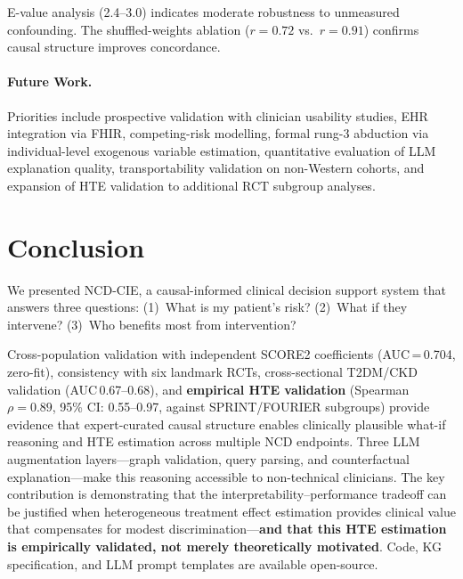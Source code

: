 \documentclass[runningheads]{llncs}
\begin{document}
E-value analysis (2.4--3.0) indicates moderate robustness to
unmeasured confounding.
The shuffled-weights ablation ($r = 0.72$ vs.\ $r = 0.91$)
confirms causal structure improves concordance.

\paragraph{Future Work.}
Priorities include prospective validation with clinician usability
studies, EHR integration via FHIR, competing-risk modelling,
formal rung-3 abduction via individual-level exogenous variable
estimation, quantitative evaluation of LLM explanation quality,
transportability validation on non-Western cohorts, and expansion
of HTE validation to additional RCT subgroup analyses.

\section{Conclusion}\label{sec:conclusion}

We presented NCD-CIE, a causal-informed clinical decision support
system that answers three questions:
(1)~What is my patient's risk?
(2)~What if they intervene?
(3)~Who benefits most from intervention?

Cross-population validation with independent SCORE2 coefficients
(AUC\,=\,0.704, zero-fit), consistency with six landmark RCTs,
cross-sectional T2DM/CKD validation (AUC\,0.67--0.68), and
\textbf{empirical HTE validation} (Spearman $\rho = 0.89$, 95\% CI:
0.55--0.97, against SPRINT/FOURIER subgroups) provide evidence that
expert-curated causal structure enables clinically plausible what-if
reasoning and HTE estimation across multiple NCD endpoints.
Three LLM augmentation layers---graph validation, query parsing,
and counterfactual explanation---make this reasoning accessible
to non-technical clinicians.
The key contribution is demonstrating that the interpretability--performance
tradeoff can be justified when heterogeneous treatment effect
estimation provides clinical value that compensates for modest
discrimination---\textbf{and that this HTE estimation is empirically
validated, not merely theoretically motivated}.
Code, KG specification, and LLM prompt templates are available
open-source.
\end{document}
